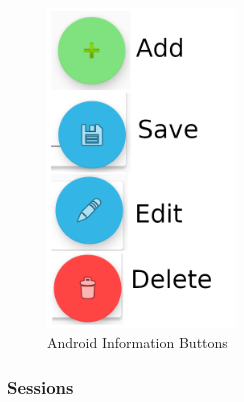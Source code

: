 \documentclass[11pt]{article}
\begin{document}
\begin{figure}
 \centering
 \includegraphics[width=5cm, keepaspectratio]{Images/AndroidInformationButtons.png}
 \caption{Android Information Buttons}
 \label{Android Information Buttons}
\end{figure}

\subsubsection{Sessions}
\label{Mobile Sessions}
\end{document}
